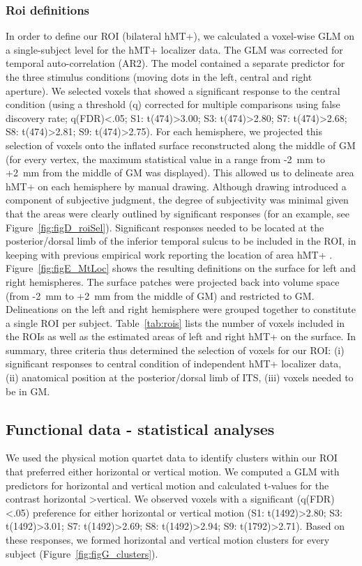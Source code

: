 \subsubsection{Roi definitions}
In order to define our ROI (bilateral hMT+), we calculated a voxel-wise GLM on a single-subject level for the hMT+ localizer data. The GLM was corrected for temporal auto-correlation (AR2). The model contained a separate predictor for the three stimulus conditions (moving dots in the left, central and right aperture). We selected voxels that showed a significant response to the central condition (using a threshold (q) corrected for multiple comparisons using false discovery rate; q(FDR)\textless.05; S1: t(474)\textgreater3.00; S3: t(474)\textgreater2.80; S7: t(474)\textgreater2.68; S8: t(474)\textgreater2.81; S9: t(474)\textgreater2.75). For each hemisphere, we projected this selection of voxels onto the inflated surface reconstructed along the middle of GM (for every vertex, the maximum statistical value in a range from -2~mm to +2~mm from the middle of GM was displayed). This allowed us to delineate area hMT+ on each hemisphere by manual drawing. Although drawing introduced a component of subjective judgment, the degree of subjectivity was minimal given that the areas were clearly outlined by significant responses (for an example, see Figure~\ref{fig:figD_roiSel}). Significant responses needed to be located at the posterior/dorsal limb of the inferior temporal sulcus to be included in the ROI, in keeping with previous empirical work reporting the location of area hMT+ \parencite{Dumoulin2000, Huk2002, Kolster2010}. Figure~\ref{fig:figE_MtLoc} shows the resulting definitions on the surface for left and right hemispheres. The surface patches were projected back into volume space (from -2~mm to +2~mm from the middle of GM) and restricted to GM. Delineations on the left and right hemisphere were grouped together to constitute a single ROI per subject. Table~\ref{tab:rois} lists the number of voxels included in the ROIs as well as the estimated areas of left and right hMT+ on the surface. In summary, three criteria thus determined the selection of voxels for our ROI: (i) significant responses to central condition of independent hMT+ localizer data, (ii) anatomical position at the posterior/dorsal limb of ITS, (iii) voxels needed to be in GM.

\subsection{Functional data - statistical analyses}
We used the physical motion quartet data to identify clusters within our ROI that preferred either horizontal or vertical motion. We computed a GLM with predictors for horizontal and vertical motion and calculated t-values for the contrast horizontal \textgreater vertical. We observed voxels with a significant (q(FDR) \textless .05) preference for either horizontal or vertical motion (S1: t(1492)\textgreater2.80; S3: t(1492)\textgreater3.01; S7: t(1492)\textgreater2.69; S8: t(1492)\textgreater2.94; S9: t(1792)\textgreater2.71). Based on these responses, we formed horizontal and vertical motion clusters for every subject (Figure~\ref{fig:figG_clusters}).

